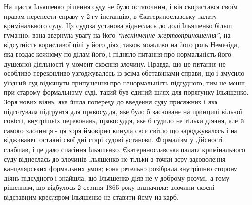 \documentclass[a4paper,20pt]{report}
\begin{document}
На щастя Ільяшенко рішення суду не було остаточним, і він скористався своїм правом перенести
справу у 2-гу інстанцію, в Єкатеринославську палату кримінального суду.
Ця судова установа віднеслась до долі Ільяшенко більш гуманно: вона звернула 
увагу на його \emph{``нескінченне жертвоприношення''}, на відсутність корисливої цілі
у його діях, також можливо на його роль Немезіди, яка воздає кожному по ділам його, і підняло
питання про нормальність його душевної діяльності у момент скоєння злочину. Правда, що це питання 
не особливо переконливо узгоджувалось із всіма обставинами справи, що і змусило уїздний суд
відкинути припущення про ненормальність підсудного; тим не менш, при старому формальному суді, такий 
був єдиний шлях для порятунку Ільяшенко. Зоря нових віянь, яка йшла попереду до введення суду
присяжних і яка підготувала підгрунтя для правосуддя, яке було б засноване на принципі вільної
совісті, внутрішніх переконань, правосуддя, яке б судило не тільки діяння, але й самого злочинця - 
ця зоря ймовірно кинула своє світло що зароджувалось і на відживаючі останні свої дні
старі судові установи. Формалізм у дійсності слабшав, і це дало спасіння Ільяшенко.
Єкатеринославська палата кримінального суду віднеслась до злочинів Ільяшенко
не тільки з точки зору задоволення канцелярських формальних умов; вона ретельно
розібрала внутрішню сторону діянь підсудного і знайшла, що Ільяшенко діяв не у доброму розумі,
а тому рішенням, що відбулось 2 серпня 1865 року визначила: злочини скоєні
відставним кресляром Ільяшенко не ставити йому на карб.
\end{document}
